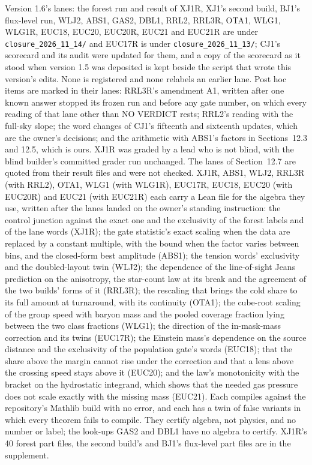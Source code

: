 \documentclass[10pt]{article}
\begin{document}
Version 1.6's lanes: the forest run and result of XJ1R, XJ1's second build, BJ1's flux-level run, WLJ2, ABS1, GAS2, DBL1, RRL2, RRL3R, OTA1, WLG1, WLG1R, EUC18, EUC20, EUC20R, EUC21 and EUC21R are under \texttt{closure\_2026\_11\_14/} and EUC17R is under \texttt{closure\_2026\_11\_13/}; CJ1's scorecard and its audit were updated for them, and a copy of the scorecard as it stood when version 1.5 was deposited is kept beside the script that wrote this version's edits. None is registered and none relabels an earlier lane. Post hoc items are marked in their lanes: RRL3R's amendment A1, written after one known answer stopped its frozen run and before any gate number, on which every reading of that lane other than NO VERDICT rests; RRL2's reading with the full-sky slope; the word changes of CJ1's fifteenth and sixteenth updates, which are the owner's decisions; and the arithmetic with ABS1's factors in Sections~12.3 and 12.5, which is ours. XJ1R was graded by a lead who is not blind, with the blind builder's committed grader run unchanged. The lanes of Section~12.7 are quoted from their result files and were not checked. XJ1R, ABS1, WLJ2, RRL3R (with RRL2), OTA1, WLG1 (with WLG1R), EUC17R, EUC18, EUC20 (with EUC20R) and EUC21 (with EUC21R) each carry a Lean file for the algebra they use, written after the lanes landed on the owner's standing instruction: the control junction against the exact one and the exclusivity of the forest labels and of the lane words (XJ1R); the gate statistic's exact scaling when the data are replaced by a constant multiple, with the bound when the factor varies between bins, and the closed-form best amplitude (ABS1); the tension words' exclusivity and the doubled-layout twin (WLJ2); the dependence of the line-of-sight Jeans prediction on the anisotropy, the star-count law at its break and the agreement of the two builds' forms of it (RRL3R); the rescaling that brings the cold share to its full amount at turnaround, with its continuity (OTA1); the cube-root scaling of the group speed with baryon mass and the pooled coverage fraction lying between the two class fractions (WLG1); the direction of the in-mask-mass correction and its twins (EUC17R); the Einstein mass's dependence on the source distance and the exclusivity of the population gate's words (EUC18); that the share above the margin cannot rise under the correction and that a lens above the crossing speed stays above it (EUC20); and the law's monotonicity with the bracket on the hydrostatic integrand, which shows that the needed gas pressure does not scale exactly with the missing mass (EUC21). Each compiles against the repository's Mathlib build with no error, and each has a twin of false variants in which every theorem fails to compile. They certify algebra, not physics, and no number or label; the look-ups GAS2 and DBL1 have no algebra to certify. XJ1R's 40 forest part files, the second build's and BJ1's flux-level part files are in the supplement.
\end{document}
